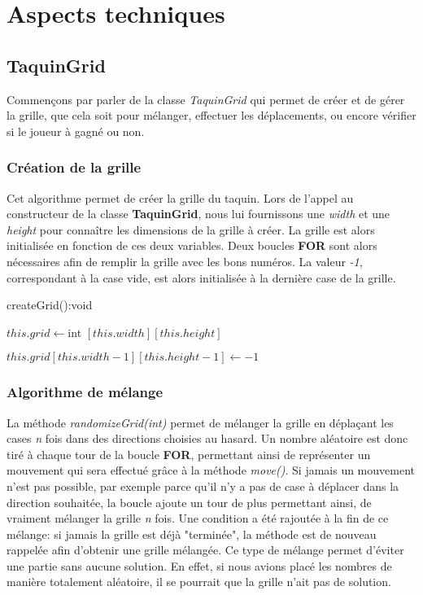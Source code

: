 \chapter{Aspects techniques}

	\section{TaquinGrid}

		Commençons par parler de la classe \textit{TaquinGrid} qui permet de créer et de gérer la grille, que cela soit pour mélanger, effectuer les déplacements, ou encore vérifier si le joueur à gagné ou non.

		\subsection{Création de la grille}

			Cet algorithme permet de créer la grille du taquin. Lors de l'appel au constructeur de la classe \textbf{TaquinGrid}, nous lui fournissons une \textit{width} et une \textit{height} pour connaître les dimensions de la grille à créer. La grille est alors initialisée en fonction de ces deux variables. Deux boucles \textbf{FOR} sont alors nécessaires afin de remplir la grille avec les bons numéros. La valeur \textit{-1}, correspondant à la case vide, est alors initialisée à la dernière case de la grille.

			\begin{algorithm}[H]
				\caption{createGrid():void}
				$this.grid \leftarrow $int $[this.width][this.height]$


				$this.grid[this.width-1][this.height-1] \leftarrow -1$
			\end{algorithm}

		\subsection{Algorithme de mélange}

			La méthode \textit{randomizeGrid(int)} permet de mélanger la grille en déplaçant les cases \textit{n} fois dans des directions choisies au hasard. Un nombre aléatoire est donc tiré à chaque tour de la boucle \textbf{FOR}, permettant ainsi de représenter un mouvement qui sera effectué grâce à la méthode \textit{move()}. Si jamais un mouvement n'est pas possible, par exemple parce qu'il n'y a pas de case à déplacer dans la direction souhaitée, la boucle ajoute un tour de plus permettant ainsi, de vraiment mélanger la grille \textit{n} fois. Une condition a été rajoutée à la fin de ce mélange: si jamais la grille est déjà "terminée", la méthode est de nouveau rappelée afin d'obtenir une grille mélangée. Ce type de mélange permet d'éviter une partie sans aucune solution. En effet, si nous avions placé les nombres de manière totalement aléatoire, il se pourrait que la grille n'ait pas de solution.

